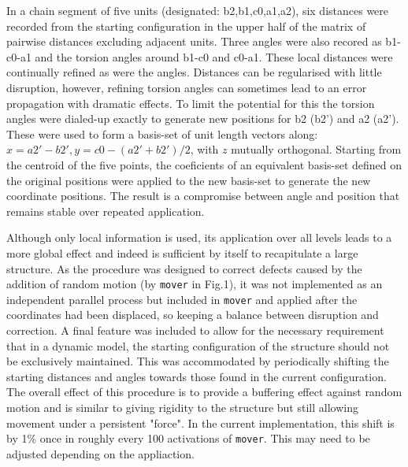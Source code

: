 In a chain segment of five units (designated: b2,b1,c0,a1,a2), six distances were
recorded from the starting configuration in the upper half of the matrix of pairwise
distances excluding adjacent units.  Three angles were also recored as b1-c0-a1 and
the torsion angles around b1-c0 and c0-a1.   These local distances were continually
refined as were the angles.  Distances can be regularised with little disruption,
however, refining torsion angles can sometimes lead to an error propagation
with dramatic effects.  To limit the potential for this the torsion angles were
dialed-up exactly to generate new positions for b2 (b2') and a2 (a2').   These were
used to form a basis-set of unit length vectors along: $x = a2'-b2', y = c0-(a2'+b2')/2$,
with $z$ mutually orthogonal.   Starting from the centroid of the five points, the 
coeficients of an equivalent basis-set defined on the original positions were applied
to the new basis-set to generate the new coordinate positions.  The result is a
compromise between angle and position that remains stable over repeated application.

Although only local information is used, its application over all levels leads to a
more global effect and indeed is sufficient by itself to recapitulate a large structure.
As the procedure was designed to correct defects caused by the addition of random
motion (by {\tt mover} in Fig.1), it was not implemented as an independent parallel 
process but included in {\tt mover} and applied after the coordinates had been 
displaced, so keeping a balance between disruption and correction.  A final feature
was included to allow for the necessary requirement that in a dynamic model, the
starting configuration of the structure should not be exclusively maintained.  This
was accommodated by periodically shifting the starting distances and angles towards
those found in the current configuration.   The overall effect of this procedure is
to provide a buffering effect against random motion and is similar to giving
rigidity to the structure but still allowing movement under a persistent "force".
In the current implementation, this shift is by 1\% once in roughly every 100
activations of {\tt mover}.  This may need to be adjusted depending on the appliaction.
